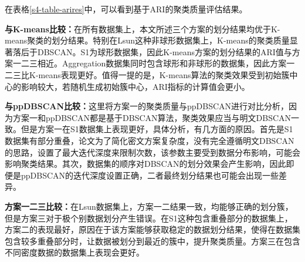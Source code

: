 \begin{table}[htbp]
	\centering
	\renewcommand{\arraystretch}{1.3}
	\caption{聚类质量评估}
	\label{s4-table-arires}
\end{table}

在表格\ref{s4-table-arires}中，可以看到基于ARI的聚类质量评估结果。

\begin{compactitem}
	\item \textbf{与K-means比较：}在所有数据集上，本文所述三个方案的划分结果均优于K-means聚类的划分结果。特别在Lsun这种非球形数据集上，K-means的聚类质量显著落后于DBSCAN。S1为球形数据集，因此K-means方案的划分结果的ARI值与方案一二三相近。Aggregation数据集同时包含球形和非球形的数据集，因此方案一二三比K-means表现更好。值得一提的是，K-means算法的聚类效果受到初始簇中心的影响较大，若随机生成初始簇中心，ARI指标的计算值会更小。
	\item
	\textbf{与ppDBSCAN比较：}这里将方案一的聚类质量与ppDBSCAN进行对比分析，因为方案一和ppDBSCAN都是基于DBSCAN算法，聚类效果应当与明文DBSCAN一致。但是方案一在S1数据集上表现更好，具体分析，有几方面的原因。首先是S1数据集有部分重叠，论文\cite{bozdemir2021privacy}为了简化密文方案复杂度，没有完全遵循明文DBSCAN的思路，设置了最大迭代深度来限制次数，该参数主要受到数据分布影响，可能会影响聚类结果。其次，数据集的顺序对DBSCAN的划分效果会产生影响，因此即便是ppDBSCAN的迭代深度设置正确，二者最终划分结果也可能会出现一些差异。
	\item
	\textbf{方案一二三比较：}在Lsun数据集上，方案一二结果一致，均能够正确的划分簇，但是方案三对于极个别数据划分产生错误。在S1这种包含重叠部分的数据集上，方案二的表现最好，原因在于该方案能够获取稳定的数据划分结果，使得在数据集包含较多重叠部分时，让数据被划分到最近的簇中，提升聚类质量。方案三在包含不同密度数据的数据集上表现会更好。
\end{compactitem}

